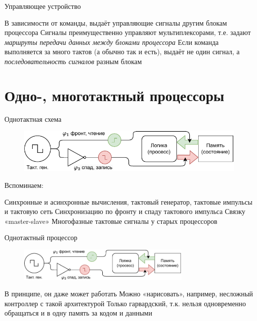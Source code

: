 \documentclass[xetex,aspectratio=43]{beamer}
\begin{document}
\begin{frame}{Управляющее устройство}
    \begin{outline}[itemize]
        \1 В зависимости от команды, выдаёт управляющие сигналы другим блокам процессора
            \2 Сигналы преимущественно управляют мультиплексорами, т.е. задают \emph{маршруты передачи данных между блоками процессора}
        \1 Если команда выполняется за много тактов (а обычно так и есть), выдаёт не один сигнал, а \emph{последовательность сигналов} разным блокам
    \end{outline}
\end{frame}

\section{Одно-, многотактный процессоры}

\begin{frame}{Однотактная схема}
    \begin{figure}
        \includegraphics[width=\textwidth, page=1]{img/11.CPUS.drawio-crop.pdf}
    \end{figure}
    Вспоминаем:
    \begin{outline}[enumerate]
        \1 Синхронные и асинхронные вычисления, тактовый генератор, тактовые импульсы и тактовую сеть
        \1 Синхронизацию по фронту и спаду тактового импульса
        \1 Связку «master-slave»
        \1 Многофазные тактовые сигналы у старых процессоров
    \end{outline}
\end{frame}

\begin{frame}{Однотактный процессор}
    \begin{figure}
        \includegraphics[width=0.75\textwidth, page=2]{img/11.CPUS.drawio-crop.pdf}
    \end{figure}

    \begin{outline}[itemize]
        \1 В принципе, он даже может работать
            \2 Можно «нарисовать», например, несложный контроллер с такой архитектурой
        \1 Только гарвардский, т.к. нельзя одновременно обращаться и в одну память за кодом и данными
    \end{outline}
\end{frame}
\end{document}
